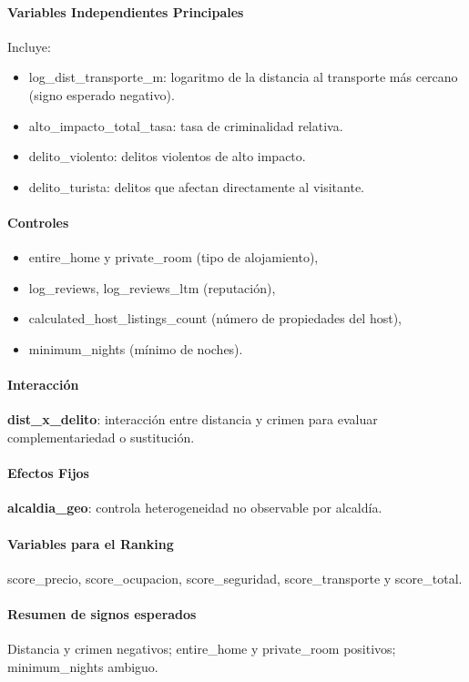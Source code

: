\documentclass[12pt]{article}
\begin{document}
\paragraph{Variables Independientes Principales}
Incluye:
\begin{itemize}
    \item log\_dist\_transporte\_m: logaritmo de la distancia al transporte más cercano (signo esperado negativo).
    \item alto\_impacto\_total\_tasa: tasa de criminalidad relativa.
    \item delito\_violento: delitos violentos de alto impacto.
    \item delito\_turista: delitos que afectan directamente al visitante.
\end{itemize}

\paragraph{Controles}
\begin{itemize}
    \item entire\_home y private\_room (tipo de alojamiento),
    \item log\_reviews, log\_reviews\_ltm (reputación),
    \item calculated\_host\_listings\_count (número de propiedades del host),
    \item minimum\_nights (mínimo de noches).
\end{itemize}

\paragraph{Interacción}
\textbf{dist\_x\_delito}: interacción entre distancia y crimen para evaluar complementariedad o sustitución.

\paragraph{Efectos Fijos}
\textbf{alcaldia\_geo}: controla heterogeneidad no observable por alcaldía.

\paragraph{Variables para el Ranking}
score\_precio, score\_ocupacion, score\_seguridad, score\_transporte y score\_total.

\paragraph{Resumen de signos esperados}
Distancia y crimen negativos; entire\_home y private\_room positivos; minimum\_nights ambiguo.
\end{document}
